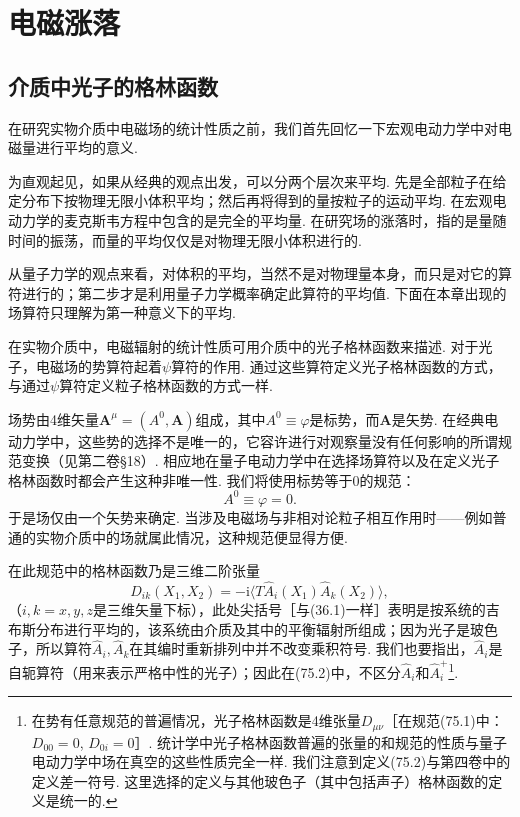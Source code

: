 \chapter{电磁涨落}

\setcounter{section}{74}

\section{介质中光子的格林函数}

在研究实物介质中电磁场的统计性质之前，我们首先回忆一下宏观电动力学中对电磁量进行平均的意义.

为直观起见，如果从经典的观点出发，可以分两个层次来平均. 先是全部粒子在给定分布下按物理无限小体积平均；然后再将得到的量按粒子的运动平均. 在宏观电动力学的麦克斯韦方程中包含的是完全的平均量. 在研究场的涨落时，指的是量随时间的振荡，而量的平均仅仅是对物理无限小体积进行的.

从量子力学的观点来看，对体积的平均，当然不是对物理量本身，而只是对它的算符进行的；第二步才是利用量子力学概率确定此算符的平均值. 下面在本章出现的场算符只理解为第一种意义下的平均.

在实物介质中，电磁辐射的统计性质可用介质中的光子格林函数来描述. 对于光子，电磁场的势算符起着$\psi$算符的作用. 通过这些算符定义光子格林函数的方式，与通过$\psi$算符定义粒子格林函数的方式一样.

场势由4维矢量$\bm{A}^{\mu}=(A^{0},\bm{A})$组成，其中$A^{0}\equiv\varphi$是标势，而$\bm{A}$是矢势. 在经典电动力学中，这些势的选择不是唯一的，它容许进行对观察量没有任何影响的所谓规范变换（见第二卷§18）. 相应地在量子电动力学中在选择场算符以及在定义光子格林函数时都会产生这种非唯一性. 我们将使用标势等于0的规范：
\begin{equation}
A^{0}\equiv\varphi=0.
\end{equation}
于是场仅由一个矢势来确定. 当涉及电磁场与非相对论粒子相互作用时——例如普通的实物介质中的场就属此情况，这种规范便显得方便.

在此规范中的格林函数乃是三维二阶张量
\begin{equation}
D_{ik}(X_{1},X_{2})=-\mathrm{i}\langle T\hat{A}_{i}(X_{1})\hat{A}_{k}(X_{2})\rangle,
\end{equation}
（$i,k=x,y,z$是三维矢量下标），此处尖括号［与(36.1)一样］表明是按系统的吉布斯分布进行平均的，该系统由介质及其中的平衡辐射所组成；因为光子是玻色子，所以算符$\hat{A}_{i},\hat{A}_{k}$在其编时重新排列中并不改变乘积符号. 我们也要指出，$\hat{A}_{i}$是自轭算符（用来表示严格中性的光子）；因此在(75.2)中，不区分$\hat{A}_{i}$和$\hat{A}_{i}^{+}$\footnote{在势有任意规范的普遍情况，光子格林函数是4维张量$D_{\mu\nu}$［在规范(75.1)中：$D_{00}=0$, $D_{0i}=0$］. 统计学中光子格林函数普遍的张量的和规范的性质与量子电动力学中场在真空的这些性质完全一样. 我们注意到定义(75.2)与第四卷中的定义差一符号. 这里选择的定义与其他玻色子（其中包括声子）格林函数的定义是统一的.}.

